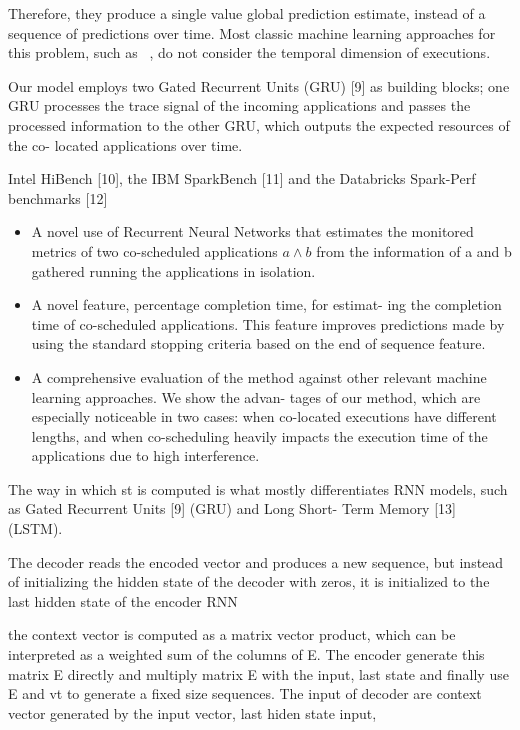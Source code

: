 \documentclass[UTF8]{article}
\begin{document}
    Therefore, they produce a single value global prediction estimate, instead of a sequence of predictions over time. Most classic machine learning approaches for this problem, such as ~\cite{mishra2017esp, delimitrou2013paragon}, do not consider the temporal dimension of executions.
    
    Our model employs two Gated Recurrent Units (GRU) [9] as building blocks; one GRU processes the trace signal of the incoming applications and passes the processed information to the other GRU, which outputs the expected resources of the co- located applications over time.
    
    Intel HiBench [10], the IBM SparkBench [11] and the Databricks Spark-Perf benchmarks [12]
    
    \begin{itemize}
    	\item  A novel use of Recurrent Neural Networks that estimates the monitored metrics of two co-scheduled applications $a \wedge b$ from the information of a and b gathered running the applications in isolation.
    	\item A novel feature, percentage completion time, for estimat- ing the completion time of co-scheduled applications. This feature improves predictions made by using the standard stopping criteria based on the end of sequence feature.
    	\item A comprehensive evaluation of the method against other relevant machine learning approaches. We show the advan- tages of our method, which are especially noticeable in two cases: when co-located executions have different lengths, and when co-scheduling heavily impacts the execution time of the applications due to high interference.
    \end{itemize}
    
    The way in which st is computed is what mostly differentiates RNN models, such as Gated Recurrent Units [9] (GRU) and Long Short- Term Memory [13] (LSTM).
    
    The decoder reads the encoded vector and produces a new sequence, but instead of initializing the hidden state of the decoder with zeros, it is initialized to the last hidden state of the encoder RNN
    
    the context vector is computed as a matrix vector product, which can be interpreted as a weighted sum of the columns of E. The encoder generate this matrix E directly and multiply matrix E with the input, last state and finally use E and vt to generate a fixed size sequences. The input of decoder are context vector generated by the input vector, last hiden state input, 
    
\end{document}
